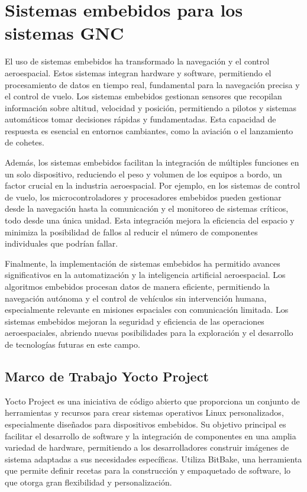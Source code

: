 \section{Sistemas embebidos para los sistemas GNC}

El uso de sistemas embebidos ha transformado la navegación y el control aeroespacial. Estos sistemas 
integran hardware y software, permitiendo el procesamiento de datos en tiempo real, fundamental para 
la navegación precisa y el control de vuelo. Los sistemas embebidos gestionan sensores que recopilan 
información sobre altitud, velocidad y posición, permitiendo a pilotos y sistemas automáticos tomar 
decisiones rápidas y fundamentadas. Esta capacidad de respuesta es esencial en entornos cambiantes, 
como la aviación o el lanzamiento de cohetes. \cite{Castao2014EstimacinDP}

Además, los sistemas embebidos facilitan la integración de múltiples funciones en un solo dispositivo, 
reduciendo el peso y volumen de los equipos a bordo, un factor crucial en la industria aeroespacial. 
Por ejemplo, en los sistemas de control de vuelo, los microcontroladores y procesadores embebidos pueden 
gestionar desde la navegación hasta la comunicación y el monitoreo de sistemas críticos, todo desde una 
única unidad. Esta integración mejora la eficiencia del espacio y minimiza la posibilidad de fallos al 
reducir el número de componentes individuales que podrían fallar. \cite{Culp1993GuidanceAC}

Finalmente, la implementación de sistemas embebidos ha permitido avances significativos en la automatización 
y la inteligencia artificial aeroespacial. Los algoritmos embebidos procesan datos de manera eficiente, permitiendo 
la navegación autónoma y el control de vehículos sin intervención humana, especialmente relevante en misiones
 espaciales con comunicación limitada. Los sistemas embebidos mejoran la seguridad y eficiencia de las operaciones 
 aeroespaciales, abriendo nuevas posibilidades para la exploración y el desarrollo de tecnologías futuras en este campo. \cite{Falcoz2023GuidanceN}

\subsection{Marco de Trabajo Yocto Project}

Yocto Project es una iniciativa de código abierto que proporciona un conjunto de herramientas y recursos para crear 
sistemas operativos Linux personalizados, especialmente diseñados para dispositivos embebidos. Su objetivo principal es 
facilitar el desarrollo de software y la integración de componentes en una amplia variedad de hardware, permitiendo a los 
desarrolladores construir imágenes de sistema adaptadas a sus necesidades específicas. Utiliza BitBake, una herramienta que 
permite definir recetas para la construcción y empaquetado de software, lo que otorga gran flexibilidad y personalización. \cite{salvador2014embedded}

